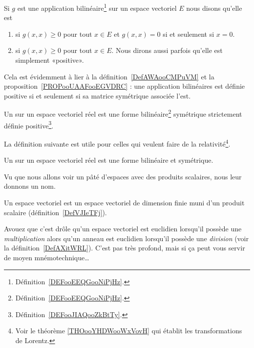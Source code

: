\begin{definition}      \label{DEFooJIAQooZkBtTy}
    Si $g$ est une application bilinéaire\footnote{Définition~\ref{DEFooEEQGooNiPjHz}.} sur un espace vectoriel \( E\) nous disons qu'elle est
    \begin{enumerate}
        \item
             si $g(x,x)\geq 0$ pour tout $x\in E$ et $g(x,x)=0$ si et seulement si $x=0$.
        \item
             si $g(x,x)\geq 0$ pour tout $x\in E$. Nous dirons aussi parfois qu'elle est simplement «positive».
        \end{enumerate}
\end{definition}
Cela est évidemment à lier à la définition~\ref{DefAWAooCMPuVM} et la proposition~\ref{PROPooUAAFooEGVDRC} : une application bilinéaires est définie positive si et seulement si sa matrice symétrique associée l'est.

\begin{definition}\label{DefVJIeTFj}
    Un  sur un espace vectoriel réel est une forme bilinéaire\footnote{Définition~\ref{DEFooEEQGooNiPjHz}.} symétrique strictement définie positive\footnote{Définition~\ref{DEFooJIAQooZkBtTy}.}.
\end{definition}

La définition suivante est utile pour celles qui veulent faire de la relativité\footnote{Voir le théorème \ref{THOooYHDWooWxVovH} qui établit les transformations de Lorentz.}.
\begin{definition}      \label{DEFooLPBGooXLxubc}
    Un  sur un espace vectoriel réel est une forme bilinéaire et symétrique.
\end{definition}

Vu que nous allons voir un pâté d'espaces avec des produits scalaires, nous leur donnons un nom.
\begin{definition}\label{DefLZMcvfj}
    Un espace vectoriel  est un espace vectoriel de dimension finie muni d'un produit scalaire (définition~\ref{DefVJIeTFj}).
\end{definition}
Avouez que c'est drôle qu'un espace vectoriel est euclidien lorsqu'il possède une \emph{multiplication} alors qu'un anneau est euclidien lorsqu'il possède une \emph{division} (voir la définition~\ref{DefAXitWRL}). C'est pas très profond, mais si ça peut vous servir de moyen mnémotechnique\ldots

